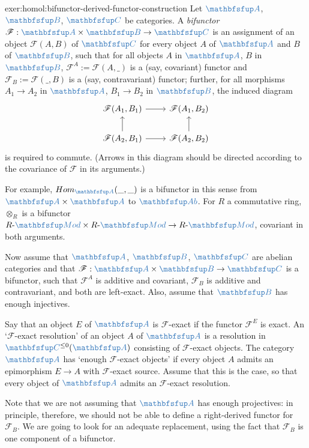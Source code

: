 \begin{exer}{\exerused{}}{exer:homol:bifunctor-derived-functor-construction}
  Let $\categ{A}$, $\categ{B}$, $\categ{C}$ be categories. A
  \emph{bifunctor}
  $\mathscr{F} : \categ{A} \times \categ{B} \to \categ{C}$ is an
  assignment of an object $\mathscr{F}(A, B)$ of $\categ{C}$ for every
  object $A$ of $\categ{A}$ and $B$ of $\categ{B}$, such that for all
  objects $A$ in $\categ{A}$, $B$ in $\categ{B}$,
  $\mathscr{F}^A := \mathscr{F}(A, \_)$ is a (say, covariant) functor
  and $\mathscr{F}_B := \mathscr{F}(\_, B)$ is a (say, contravariant)
  functor; further, for all morphisms $A_1 \to A_2$ in $\categ{A}$,
  $B_1 \to B_2$ in $\categ{B}$, the induced diagram
  \[\begin{tikzcd}
      \mathscr{F}(A_1, B_1) \arrow[r] & \mathscr{F}(A_1, B_2) \\
      \mathscr{F}(A_2, B_1) \arrow[r] \arrow[u] & \mathscr{F}(A_2,
      B_2) \arrow[u]
    \end{tikzcd}\] is required to commute. (Arrows in this diagram
  should be directed according to the covariance of $\mathscr{F}$ in
  its arguments.)

  For example, $\Hom_{\categ{A}}(\_, \_)$ is a bifunctor in this sense
  from $\categ{A} \times \categ{A}$ to $\categ{Ab}$. For $R$ a
  commutative ring, $\otimes_R$ is a bifunctor
  $R\text{-}\categ{Mod} \times R\text{-}\categ{Mod} \to
  R\text{-}\categ{Mod}$, covariant in both arguments.

  Now assume that $\categ{A}$, $\categ{B}$, $\categ{C}$ are abelian
  categories and that
  $\mathscr{F} : \categ{A} \times \categ{B} \to \categ{C}$ is a
  bifunctor, such that $\mathscr{F}^A$ is additive and covariant,
  $\mathscr{F}_B$ is additive and contravariant, and both are
  left-exact. Also, assume that $\categ{B}$ has enough injectives.

  Say that an object $E$ of $\categ{A}$ is $\mathscr{F}$-exact if the
  functor $\mathscr{F}^E$ is exact. An `$\mathscr{F}$-exact
  resolution' of an object $A$ of $\categ{A}$ is a resolution in
  $\categ{C}^{\le 0}(\categ{A})$ consisting of $\mathscr{F}$-exact
  objects. The category $\categ{A}$ has `enough $\mathscr{F}$-exact
  objects' if every object $A$ admits an epimorphism $E \to A$ with
  $\mathscr{F}$-exact source. Assume that this is the case, so that
  every object of $\categ{A}$ admits an $\mathscr{F}$-exact
  resolution.

  Note that we are not assuming that $\categ{A}$ has enough
  projectives: in principle, therefore, we should not be able to
  define a right-derived functor for $\mathscr{F}_B$. We are going to
  look for an adequate replacement, using the fact that
  $\mathscr{F}_B$ is one component of a bifunctor.


\end{exer}
